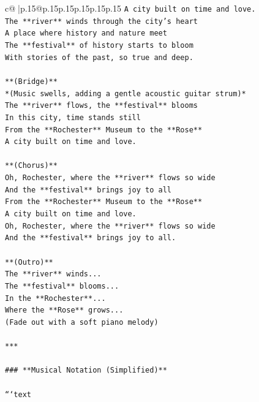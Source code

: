\documentclass{article}
\begin{document}
{\begin{supertabular}{c@{$\;$}|p{.15\linewidth}@{}p{.15\linewidth}p{.15\linewidth}p{.15\linewidth}p{.15\linewidth}p{.15\linewidth}}
{{{\texttt{A city built on time and love.} \\
\texttt{The **river** winds through the city's heart} \\
\texttt{A place where history and nature meet} \\
\texttt{The **festival** of history starts to bloom} \\
\texttt{With stories of the past, so true and deep.} \\
\\ 
\texttt{**(Bridge)**} \\
\texttt{*(Music swells, adding a gentle acoustic guitar strum)*} \\
\texttt{The **river** flows, the **festival** blooms} \\
\texttt{In this city, time stands still} \\
\texttt{From the **Rochester** Museum to the **Rose**} \\
\texttt{A city built on time and love.} \\
\\ 
\texttt{**(Chorus)**} \\
\texttt{Oh, Rochester, where the **river** flows so wide} \\
\texttt{And the **festival** brings joy to all} \\
\texttt{From the **Rochester** Museum to the **Rose**} \\
\texttt{A city built on time and love.} \\
\texttt{Oh, Rochester, where the **river** flows so wide} \\
\texttt{And the **festival** brings joy to all.} \\
\\ 
\texttt{**(Outro)**} \\
\texttt{The **river** winds...} \\
\texttt{The **festival** blooms...} \\
\texttt{In the **Rochester**...} \\
\texttt{Where the **Rose** grows...} \\
\texttt{(Fade out with a soft piano melody)} \\
\\ 
\texttt{***} \\
\\ 
\texttt{\#\#\# **Musical Notation (Simplified)**} \\
\\ 
\texttt{```text} \\
}}}
\end{supertabular}}
\end{document}
